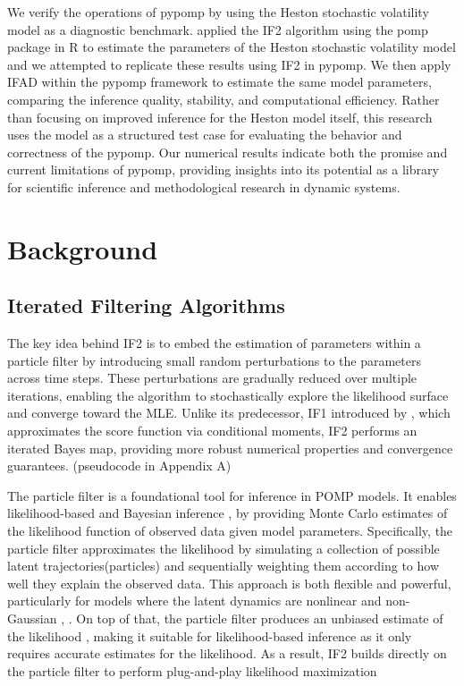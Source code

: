 \documentclass[11pt]{report}
\begin{document}
We verify the operations of pypomp by using the Heston stochastic volatility model as a diagnostic benchmark. \textbf{\citet{sunmodel}} applied the IF2 algorithm using the pomp package in R to estimate the parameters of the Heston stochastic volatility model and we attempted to replicate these results using IF2 in pypomp. We then apply IFAD within the pypomp framework to estimate the same model parameters, comparing the inference quality, stability, and computational efficiency. Rather than focusing on improved inference for the Heston model itself, this research uses the model as a structured test case for evaluating the behavior and correctness of the pypomp. Our numerical results indicate both the promise and current limitations of pypomp, providing insights into its potential as a library for scientific inference and methodological research in dynamic systems.


\chapter{Background}\label{chap:background}

\section{Iterated Filtering Algorithms}
The key idea behind IF2 is to embed the estimation of parameters within a particle filter by introducing small random perturbations to the parameters across time steps. These perturbations are gradually reduced over multiple iterations, enabling the algorithm to stochastically explore the likelihood surface and converge toward the MLE. Unlike its predecessor, IF1 introduced by \textbf{\citet{ionides2011iterated}}, which approximates the score function via conditional moments, IF2 performs an iterated Bayes map, providing more robust numerical properties and convergence guarantees. (pseudocode in Appendix A)

The particle filter is a foundational tool for inference in POMP models. It enables likelihood-based \textbf{\citet{ionides2006inference}} and Bayesian inference \textbf{\citet{chopin2013smc2}}, \textbf{\citet{andrieu2010particle}} by providing Monte Carlo estimates of the likelihood function of observed data given model parameters. Specifically, the particle filter approximates the likelihood by simulating a collection of possible latent trajectories(particles) and sequentially weighting them according to how well they explain the observed data. This approach is both flexible and powerful, particularly for models where the latent dynamics are nonlinear and non-Gaussian \textbf{\citet{arulampalam2002tutorial}}, \textbf{\citet{kitagawa1987non}}. On top of that, the particle filter produces an unbiased estimate of the likelihood \textbf{\citet{doucet2001sequential}}, making it suitable for likelihood-based inference as it only requires accurate estimates for the likelihood. As a result, IF2 builds directly on the particle filter to perform plug-and-play likelihood maximization
\end{document}
